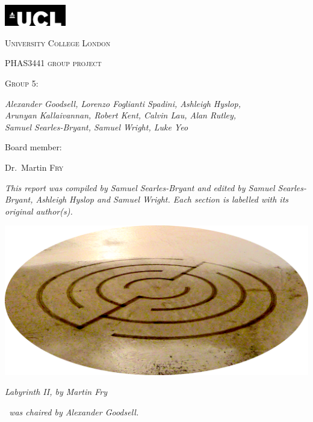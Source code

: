 \pagestyle{plain}

\begin{titlepage}
    \centering
    \includegraphics[width=0.2\textwidth]{Files/UCL}\par\vspace{1cm}
    {\scshape\LARGE University College London \par}
    \vspace{1cm}
    {\scshape PHAS3441 group project\par}
    {\scshape Group 5:~\teamname\par}
    \vspace{1.5cm}
    {\huge\bfseries {} \projectTitle\par}
    \vspace{2cm}
    {\Large\itshape Alexander Goodsell, Lorenzo Foglianti Spadini, Ashleigh Hyslop,\\ Arunyan Kallaivannan, Robert Kent, Calvin Lau, Alan Rutley,\\ Samuel Searles-Bryant, Samuel Wright, Luke Yeo\par}
    \vfill
    Board member:\par
    Dr.~Martin \textsc{Fry}

    \vfill

    {\large \thedate\par}
\end{titlepage}

{\centering
{\itshape This report was compiled by Samuel Searles-Bryant and edited by Samuel Searles-Bryant, Ashleigh Hyslop and Samuel Wright. Each section is labelled with its original author(s).\par}
\vfill
\includegraphics[width=\textwidth]{Files/labyrinth_II_ellipse}\par
{\itshape \emph{Labyrinth II}, by Martin Fry\par}
\vfill
{\itshape \teamname~was chaired by Alexander Goodsell.\par}
}
